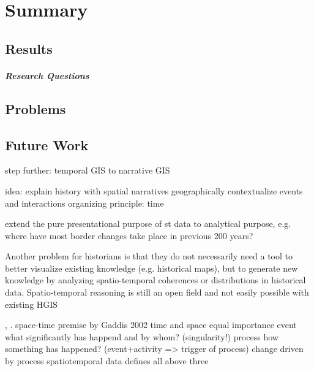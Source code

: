 
\chapter{Summary} %
\label{cha:summary}


\section{Results} %
\label{sec:results}



\paragraph{Research Questions} %
\label{par:result_research_questions}



\section{Problems} %
\label{sec:problems}




\section{Future Work} %
\label{sec:future_work}

step further: temporal GIS to narrative GIS

idea: explain history with spatial narratives
  geographically contextualize events and interactions
  organizing principle: time

extend the pure presentational purpose of st data to analytical purpose, e.g. where have most border changes take place in previous 200 years?

Another problem for historians is that they do not necessarily need a tool to better visualize existing knowledge (e.g. historical maps), but to generate new knowledge by analyzing spatio-temporal coherences or distributions in historical data. Spatio-temporal reasoning is still an open field and not easily possible with existing HGIS

\cite[p. 268]{knowles2008placing}, \cite[p. xii]{gregory2014toward}.
space-time premise by Gaddis 2002
  time and space equal importance
  event     what significantly has happend and by whom? (singularity!)
  process   how something has happened? (event+activity => trigger of process)
  change    driven by process
  spatiotemporal data defines all above three






